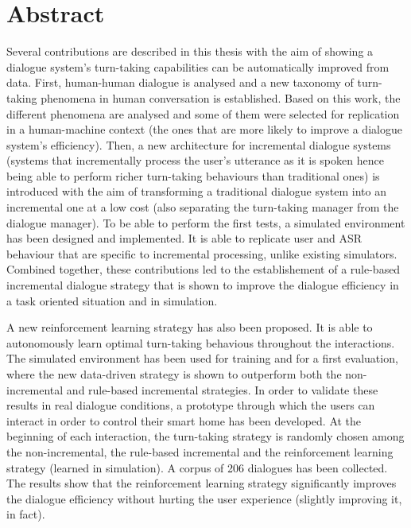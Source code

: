 \chapter*{Abstract}

     Several contributions are described in this thesis with the aim of showing a dialogue system's turn-taking capabilities can be automatically improved from data. First, human-human dialogue is analysed and a new taxonomy of turn-taking phenomena in human conversation is established. Based on this work, the different phenomena are analysed and some of them were selected for replication in a human-machine context (the ones that are more likely to improve a dialogue system's efficiency). Then, a new architecture for incremental dialogue systems (systems that incrementally process the user's utterance as it is spoken hence being able to perform richer turn-taking behaviours than traditional ones) is introduced with the aim of transforming a traditional dialogue system into an incremental one at a low cost (also separating the turn-taking manager from the dialogue manager). To be able to perform the first tests, a simulated environment has been designed and implemented. It is able to replicate user and ASR behaviour that are specific to incremental processing, unlike existing simulators. Combined together, these contributions led to the establishement of a rule-based incremental dialogue strategy that is shown to improve the dialogue efficiency in a task oriented situation and in simulation.

     A new reinforcement learning strategy has also been proposed. It is able to autonomously learn optimal turn-taking behavious throughout the interactions. The simulated environment has been used for training and for a first evaluation, where the new data-driven strategy is shown to outperform both the non-incremental and rule-based incremental strategies. In order to validate these results in real dialogue conditions, a prototype through which the users can interact in order to control their smart home has been developed. At the beginning of each interaction, the turn-taking strategy is randomly chosen among the non-incremental, the rule-based incremental and the reinforcement learning strategy (learned in simulation). A corpus of 206 dialogues has been collected. The results show that the reinforcement learning strategy significantly improves the dialogue efficiency without hurting the user experience (slightly improving it, in fact).
